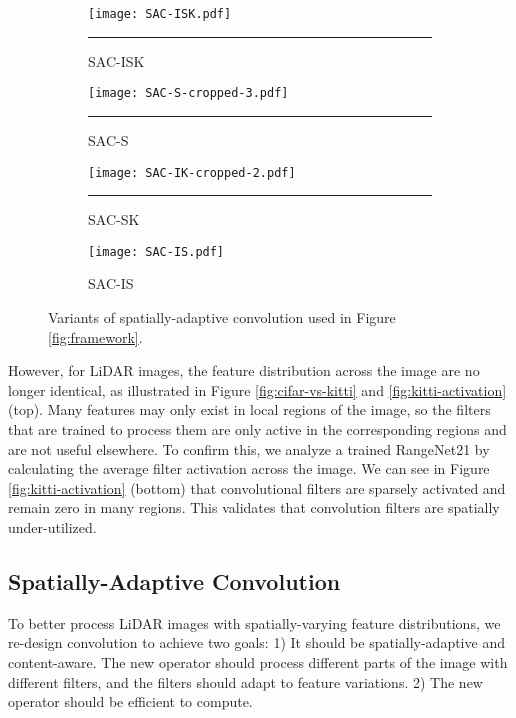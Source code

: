 \documentclass[runningheads]{llncs}
\begin{document}
\begin{figure*}[t!]


\centering
\begin{subfigure}[b]{0.75\textwidth}
         \centering
         \texttt{[image: SAC-ISK.pdf]}
         \caption{SAC-ISK}
         \hrule
         \label{fig:SAC-ISK}
     \end{subfigure}
     \hfill
     \begin{subfigure}[b]{0.75\textwidth}
         \centering
         \texttt{[image: SAC-S-cropped-3.pdf]}
         \caption{SAC-S}
         \hrule
         \label{fig:SAC-S}
     \end{subfigure}
     \hfill
     \begin{subfigure}[b]{0.75\textwidth}
         \centering
         \texttt{[image: SAC-IK-cropped-2.pdf]}
         \caption{SAC-SK}
         \hrule
         \label{fig:SAC-SK}
     \end{subfigure}
     \hfill
     \begin{subfigure}[b]{0.75\textwidth}
         \centering
         \texttt{[image: SAC-IS.pdf]}
         \caption{SAC-IS}
         \label{fig:SAC-IS}
     \end{subfigure}
          \hfill
        \caption{Variants of spatially-adaptive convolution used in Figure \ref{fig:framework}.}
        \label{fig:form}
\centering
\end{figure*}

However, for LiDAR images, the feature distribution across the image are no longer identical, as illustrated in Figure \ref{fig:cifar-vs-kitti} and \ref{fig:kitti-activation} (top). Many features may only exist in local regions of the image, so the filters that are trained to process them are only active in the corresponding regions and are not useful elsewhere. To confirm this, we analyze a trained RangeNet21 \cite{milioto2019rangenet++} by calculating the average filter activation across the image. We can see in Figure \ref{fig:kitti-activation} (bottom) that convolutional filters are sparsely activated and remain zero in many regions. This validates that convolution filters are spatially under-utilized. 
\subsection{Spatially-Adaptive Convolution}
\label{sec:sac-variant}
To better process LiDAR images with spatially-varying feature distributions, we re-design convolution to achieve two goals: 1) It should be spatially-adaptive and content-aware. The new operator should process different parts of the image with different filters, and the filters should adapt to feature variations. 2) The new operator should be efficient to compute. 
\end{document}
